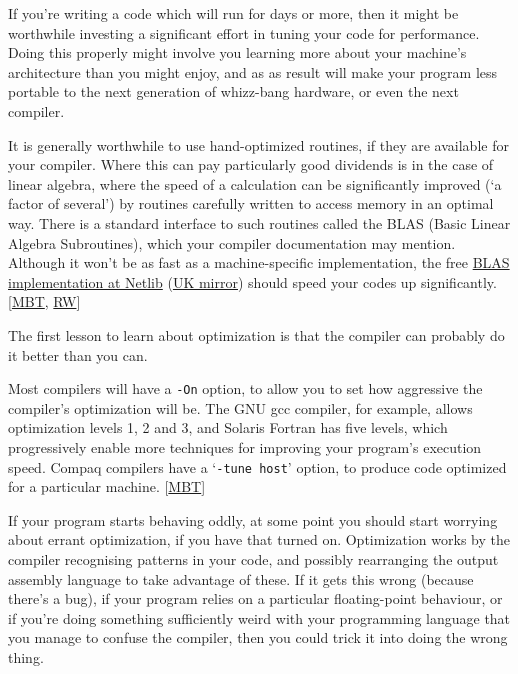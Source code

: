 \documentclass[11pt,oneside,chapters]{starlink}
\begin{document}
If you're writing a code which will run for days or more,
then it might be worthwhile investing a significant effort
in tuning your code for performance.  Doing this properly
might involve you learning more about your machine's
architecture than you might enjoy, and as as result will
make your program less portable to the next generation of
whizz-bang hardware, or even the next compiler.

It is generally worthwhile to use hand-optimized
routines, if they are available for your compiler.  Where
this can pay particularly good dividends is in the case of
linear algebra, where the speed of a calculation can be
significantly improved (`a factor of several') by routines
carefully written to access memory in an optimal way.
There is a standard interface to such routines called the
BLAS (Basic Linear Algebra Subroutines), which your
compiler documentation may mention.
Although it won't
be as fast as a machine-specific implementation, the free
\href{http://www.netlib.org/blas/}{BLAS implementation at Netlib}
(\href{http://sunsite.doc.ic.ac.uk/packages/netlib/blas/index.html}{UK mirror})
should speed your codes up
significantly. [\hyperlink{ta:mbt}{MBT}, \hyperlink{ta:rw}{RW}]

The first lesson to learn about optimization is that the
compiler can probably do it better than you can.

Most compilers will have a \texttt{-On} option, to
allow you to set how aggressive the compiler's
optimization will be.  The GNU gcc compiler, for example,
allows optimization levels 1, 2 and 3, and Solaris Fortran
has five levels, which progressively enable more
techniques for improving your program's execution speed.
Compaq compilers have a `\texttt{-tune host}' option,
to produce code optimized for a particular machine.
[\hyperlink{ta:mbt}{MBT}]

If your program starts behaving oddly, at some point you
should start worrying about errant optimization, if you
have that turned on.  Optimization works by the compiler
recognising patterns in your code, and possibly
rearranging the output assembly language to take advantage
of these.  If it gets this wrong (because there's a bug),
if your program relies on a particular floating-point
behaviour, or if you're doing something sufficiently weird
with your programming language that you manage to confuse
the compiler, then you could trick it into doing the wrong
thing.
\end{document}
